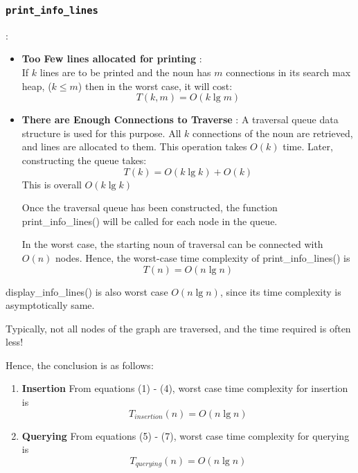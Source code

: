 \documentclass[conference]{IEEEtran}
\begin{document}
\subsubsection{\textbf{\texttt{print\_info\_lines}}} :
    \begin{itemize}
        \item \textbf{Too Few lines allocated for printing} : 
\\If $k$ lines are to be printed
and the noun has $m$ connections in its search max heap, ($k \leq m$)
then in the worst case, it will cost:
\begin{equation}
	T(k, m) = O(k\lg m)
\end{equation}

\item \textbf{There are Enough Connections to Traverse} : 
A traversal queue data structure is used for this purpose.
All $k$ connections of the noun are retrieved, and lines are
allocated to them. This operation takes $O(k)$ time. Later,
constructing the queue takes:
\begin{equation}
    T(k) = O(k\lg k) + O(k)
\end{equation}
This is overall $O(k\lg k)$

Once the traversal queue has been constructed, the function print\_info\_lines() will be called for each node
in the queue.

In the worst case, the starting noun of traversal can be connected with $O(n)$ nodes. Hence, the worst-case time complexity of print\_info\_lines() is
\begin{equation}
    T(n) = O(n\lg n)
\end{equation}
\end{itemize}

display\_info\_lines() is also worst case $O(n \lg n)$, since its time complexity is asymptotically same.

Typically, not all nodes of the graph are traversed, and the
time required is often less!

Hence, the conclusion is as follows:
\begin{enumerate}
    \item \textbf{Insertion} From equations (1) - (4), worst case time complexity for insertion is 
    \begin{equation*}
        T_{insertion}(n) = O(n\lg n) 
    \end{equation*}

    \item \textbf{Querying} From equations (5) - (7), worst case time complexity for querying is 
    \begin{equation*}
        T_{querying}(n) = O(n\lg n) 
    \end{equation*}
\end{enumerate}
\end{document}
